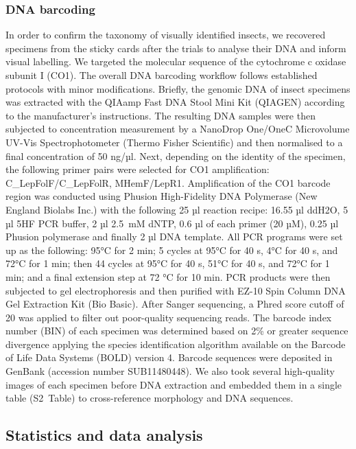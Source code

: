 \documentclass[12pt]{article}
\begin{document}
\begin{linenumbers}
		\subsubsection*{DNA barcoding}
		In order to confirm the taxonomy of visually identified insects, we recovered specimens from the sticky cards after the trials to analyse their DNA and inform visual labelling. We targeted the molecular sequence of the cytochrome c oxidase subunit I (CO1). The overall DNA barcoding workflow follows established protocols\cite{dewaard_expedited_2018} with minor modifications. Briefly, the genomic DNA of insect specimens was extracted with the QIAamp Fast DNA Stool Mini Kit (QIAGEN) according to the manufacturer’s instructions. The resulting DNA samples were then subjected to concentration measurement by a NanoDrop One/OneC Microvolume UV-Vis Spectrophotometer (Thermo Fisher Scientific) and then normalised to a final concentration of 50 ng/µl. Next, depending on the identity of the specimen, the following primer pairs were selected for CO1 amplification: C\_LepFolF/C\_LepFolR\cite{hernandeztriana_recovery_2014}, MHemF/LepR1\cite{park_barcoding_2011}. Amplification of the CO1 barcode region was conducted using Phusion High-Fidelity DNA Polymerase (New England Biolabs Inc.) with the following 25 µl reaction recipe: 16.55 µl ddH2O, 5 µl 5HF PCR buffer, 2 µl 2.5~mM dNTP, 0.6 µl of each primer (20 µM), 0.25 µl Phusion polymerase and finally 2 µl DNA template. All PCR programs were set up as the following: 95°C for 2 min; 5 cycles at 95°C for 40 s, 4°C for 40 s, and 72°C for 1 min; then 44 cycles at 95°C for 40 s, 51°C for 40 s, and 72°C for 1 min; and a final extension step at 72 °C for 10 min. PCR products were then subjected to gel electrophoresis and then purified with EZ-10 Spin Column DNA Gel Extraction Kit (Bio Basic). After Sanger sequencing, a Phred score cutoff of 20 was applied to filter out poor-quality sequencing reads. 
		The barcode index number (BIN) of each specimen was determined based on 2\% or greater sequence divergence applying the species identification algorithm available on the Barcode of Life Data Systems (BOLD) version 4\cite{ratnasingham_dna-based_2013}. Barcode sequences were deposited in GenBank (accession number SUB11480448). We also took several high-quality images of each specimen before DNA extraction and embedded them in a single table (S2~Table) to cross-reference morphology and DNA sequences\cite{bianchi_getting_2021}.
		
		
		\subsection*{Statistics and data analysis}
		

\end{linenumbers}
\end{document}
